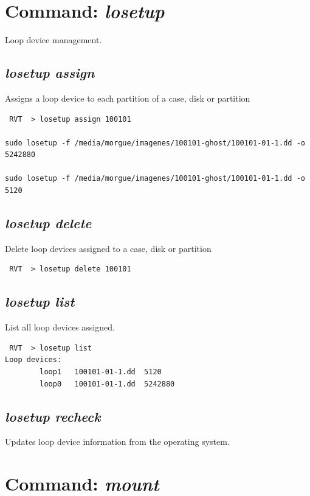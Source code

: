 \documentclass[a4paper,11pt,oneside]{report}
\begin{document}
\section{Command: \emph{losetup}}

Loop device management.

\subsection{\emph{losetup assign}}

Assigns a loop device to each partition of a case, disk or partition

\begin{verbatim}
 RVT  > losetup assign 100101

sudo losetup -f /media/morgue/imagenes/100101-ghost/100101-01-1.dd -o 5242880

sudo losetup -f /media/morgue/imagenes/100101-ghost/100101-01-1.dd -o 5120
\end{verbatim}


\subsection{\emph{losetup delete}}

Delete loop devices assigned to a case, disk or partition

\begin{verbatim}
 RVT  > losetup delete 100101
\end{verbatim}


\subsection{\emph{losetup list}}

List all loop devices assigned.

\begin{verbatim}
 RVT  > losetup list                                                          
Loop devices: 
        loop1   100101-01-1.dd  5120
        loop0   100101-01-1.dd  5242880
\end{verbatim}


\subsection{\emph{losetup recheck}}

Updates loop device information from the operating system.


\section{Command: \emph{mount}}
\end{document}
